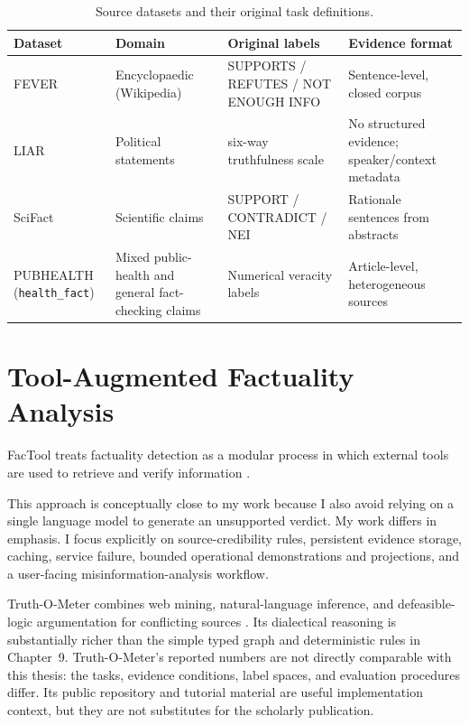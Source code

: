 \documentclass[12pt,a4paper,openany]{report}
\begin{document}
\begin{table}[H]
\centering
\caption{Source datasets and their original task definitions.}
\label{tab:dataset-lit}
\scriptsize
\begin{tabularx}{\textwidth}{>{\raggedright\arraybackslash}p{2.15cm}>{\raggedright\arraybackslash}p{3.15cm}>{\raggedright\arraybackslash}p{3.45cm}>{\raggedright\arraybackslash}X}
\toprule
Dataset & Domain & Original labels & Evidence format \\
\midrule
FEVER & Encyclopaedic (Wikipedia) & SUPPORTS / REFUTES / NOT ENOUGH INFO & Sentence-level, closed corpus \\
LIAR & Political statements & six-way truthfulness scale & No structured evidence; speaker/context metadata \\
SciFact & Scientific claims & SUPPORT / CONTRADICT / NEI & Rationale sentences from abstracts \\
PUBHEALTH (\texttt{health\_fact}) & Mixed public-health and general fact-checking claims & Numerical veracity labels & Article-level, heterogeneous sources \\
\bottomrule
\end{tabularx}
\end{table}

\section{Tool-Augmented Factuality Analysis}
FacTool treats factuality detection as a modular process in which external tools are used to retrieve and verify information \citep{chern2023factool}.

This approach is conceptually close to my work because I also avoid relying on a single language model to generate an unsupported verdict. My work differs in emphasis. I focus explicitly on source-credibility rules, persistent evidence storage, caching, service failure, bounded operational demonstrations and projections, and a user-facing misinformation-analysis workflow.

Truth-O-Meter combines web mining, natural-language inference, and
defeasible-logic argumentation for conflicting sources
\citep{galitsky2025truthometer}. Its dialectical reasoning is substantially
richer than the simple typed graph and deterministic rules in Chapter~9.
Truth-O-Meter's reported numbers are not directly comparable with this thesis:
the tasks, evidence conditions, label spaces, and evaluation procedures differ.
Its public repository and tutorial material are useful implementation context,
but they are not substitutes for the scholarly publication.
\end{document}
